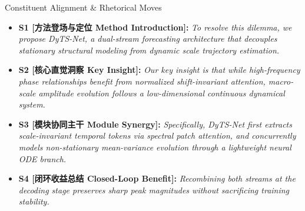 \begin{TipBox}{Constituent Alignment \& Rhetorical Moves}
\begin{itemize}[leftmargin=1.5em]
  \item \textbf{S1 [方法登场与定位 Method Introduction]:} \textit{To resolve this dilemma, we propose DyTS-Net, a dual-stream forecasting architecture that decouples stationary structural modeling from dynamic scale trajectory estimation.}\par{}
  \item \textbf{S2 [核心直觉洞察 Key Insight]:} \textit{Our key insight is that while high-frequency phase relationships benefit from normalized shift-invariant attention, macro-scale amplitude evolution follows a low-dimensional continuous dynamical system.}\par{}
  \item \textbf{S3 [模块协同主干 Module Synergy]:} \textit{Specifically, DyTS-Net first extracts scale-invariant temporal tokens via spectral patch attention, and concurrently models non-stationary mean-variance evolution through a lightweight neural ODE branch.}\par{}
  \item \textbf{S4 [闭环收益总结 Closed-Loop Benefit]:} \textit{Recombining both streams at the decoding stage preserves sharp peak magnitudes without sacrificing training stability.}\par{}
\end{itemize}
\end{TipBox}
\bigskip

